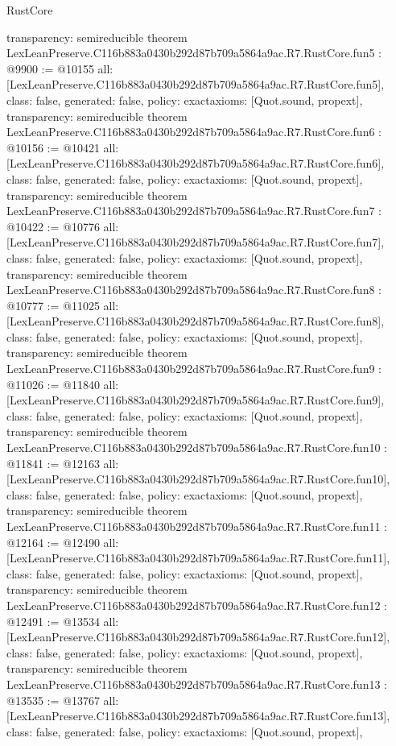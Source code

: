 \begin{lexlean}{RustCore}
\begin{coremodule}
{  transparency: semireducible
}
theorem LexLeanPreserve.C116b883a0430b292d87b709a5864a9ac.R7.RustCore.fun5 : @9900 := @10155 {
  all: [LexLeanPreserve.C116b883a0430b292d87b709a5864a9ac.R7.RustCore.fun5],
  class: false,
  generated: false,
  policy: exact{axioms: [Quot.sound, propext]},
  transparency: semireducible
}
theorem LexLeanPreserve.C116b883a0430b292d87b709a5864a9ac.R7.RustCore.fun6 : @10156 := @10421 {
  all: [LexLeanPreserve.C116b883a0430b292d87b709a5864a9ac.R7.RustCore.fun6],
  class: false,
  generated: false,
  policy: exact{axioms: [Quot.sound, propext]},
  transparency: semireducible
}
theorem LexLeanPreserve.C116b883a0430b292d87b709a5864a9ac.R7.RustCore.fun7 : @10422 := @10776 {
  all: [LexLeanPreserve.C116b883a0430b292d87b709a5864a9ac.R7.RustCore.fun7],
  class: false,
  generated: false,
  policy: exact{axioms: [Quot.sound, propext]},
  transparency: semireducible
}
theorem LexLeanPreserve.C116b883a0430b292d87b709a5864a9ac.R7.RustCore.fun8 : @10777 := @11025 {
  all: [LexLeanPreserve.C116b883a0430b292d87b709a5864a9ac.R7.RustCore.fun8],
  class: false,
  generated: false,
  policy: exact{axioms: [Quot.sound, propext]},
  transparency: semireducible
}
theorem LexLeanPreserve.C116b883a0430b292d87b709a5864a9ac.R7.RustCore.fun9 : @11026 := @11840 {
  all: [LexLeanPreserve.C116b883a0430b292d87b709a5864a9ac.R7.RustCore.fun9],
  class: false,
  generated: false,
  policy: exact{axioms: [Quot.sound, propext]},
  transparency: semireducible
}
theorem LexLeanPreserve.C116b883a0430b292d87b709a5864a9ac.R7.RustCore.fun10 : @11841 := @12163 {
  all: [LexLeanPreserve.C116b883a0430b292d87b709a5864a9ac.R7.RustCore.fun10],
  class: false,
  generated: false,
  policy: exact{axioms: [Quot.sound, propext]},
  transparency: semireducible
}
theorem LexLeanPreserve.C116b883a0430b292d87b709a5864a9ac.R7.RustCore.fun11 : @12164 := @12490 {
  all: [LexLeanPreserve.C116b883a0430b292d87b709a5864a9ac.R7.RustCore.fun11],
  class: false,
  generated: false,
  policy: exact{axioms: [Quot.sound, propext]},
  transparency: semireducible
}
theorem LexLeanPreserve.C116b883a0430b292d87b709a5864a9ac.R7.RustCore.fun12 : @12491 := @13534 {
  all: [LexLeanPreserve.C116b883a0430b292d87b709a5864a9ac.R7.RustCore.fun12],
  class: false,
  generated: false,
  policy: exact{axioms: [Quot.sound, propext]},
  transparency: semireducible
}
theorem LexLeanPreserve.C116b883a0430b292d87b709a5864a9ac.R7.RustCore.fun13 : @13535 := @13767 {
  all: [LexLeanPreserve.C116b883a0430b292d87b709a5864a9ac.R7.RustCore.fun13],
  class: false,
  generated: false,
  policy: exact{axioms: [Quot.sound, propext]},
}
\end{coremodule}
\end{lexlean}
